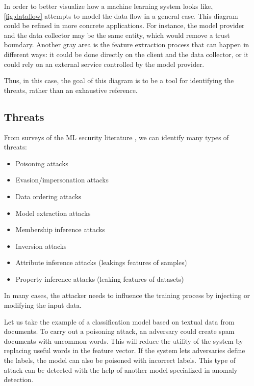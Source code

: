 \documentclass[a4paper,11pt,oneside]{report}
\begin{document}
In order to better visualize how a machine learning system looks like, \autoref{fig:dataflow} attempts to model the data flow in a general case. This diagram could be refined in more concrete applications. For instance, the model provider and the data collector may be the same entity, which would remove a trust boundary. Another gray area is the feature extraction process that can happen in different ways: it could be done directly on the client and the data collector, or it could rely on an external service controlled by the model provider.

Thus, in this case, the goal of this diagram is to be a tool for identifying the threats, rather than an exhaustive reference.

\subsection{Threats}\label{sec:threats}

From surveys of the ML security literature \cite{liu_survey_2018, rigaki_survey_2021}, we can identify many types of threats:

\begin{itemize}
    \item Poisoning attacks
    \item Evasion/impersonation attacks
    \item Data ordering attacks
    \item Model extraction attacks
    \item Membership inference attacks
    \item Inversion attacks
    \item Attribute inference attacks (leakings features of samples)
    \item Property inference attacks (leaking features of datasets)
\end{itemize}

In many cases, the attacker needs to influence the training process by injecting or modifying the input data.

Let us take the example of a classification model based on textual data from documents. To carry out a poisoning attack, an adversary could create spam documents with uncommon words. This will reduce the utility of the system by replacing useful words in the feature vector. If the system lets adversaries define the labels, the model can also be poisoned with incorrect labels. This type of attack can be detected with the help of another model specialized in anomaly detection.
\end{document}

